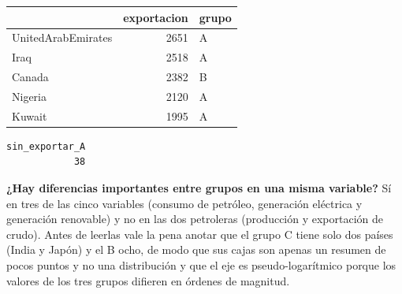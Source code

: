 \documentclass[oneside, openany, fontset=libertinus]{mitthesis}
\newenvironment{Shaded}{\begin{snugshade}}{\end{snugshade}}
\newcommand{\AttributeTok}[1]{\textcolor[rgb]{0.40,0.45,0.13}{#1}}
\newcommand{\DecValTok}[1]{\textcolor[rgb]{0.68,0.00,0.00}{#1}}
\newcommand{\FunctionTok}[1]{\textcolor[rgb]{0.28,0.35,0.67}{#1}}
\newcommand{\NormalTok}[1]{\textcolor[rgb]{0.00,0.23,0.31}{#1}}
\newcommand{\OtherTok}[1]{\textcolor[rgb]{0.00,0.23,0.31}{#1}}
\newcommand{\SpecialCharTok}[1]{\textcolor[rgb]{0.37,0.37,0.37}{#1}}
\newcommand{\StringTok}[1]{\textcolor[rgb]{0.13,0.47,0.30}{#1}}
\begin{document}
\Needspace{2.66in}

\begin{Shaded}
\end{Shaded}

\Needspace{1.93in}

{\def\LTcaptype{none} %
\begin{longtable}[]{@{}lrl@{}}
\toprule\noalign{}
& exportacion & grupo \\
\midrule\noalign{}
\endhead
\bottomrule\noalign{}
\endlastfoot
UnitedArabEmirates & 2651 & A \\
Iraq & 2518 & A \\
Canada & 2382 & B \\
Nigeria & 2120 & A \\
Kuwait & 1995 & A \\
\end{longtable}
}

\Needspace{0.57in}

\begin{Shaded}
\end{Shaded}

\begin{verbatim}
sin_exportar_A 
            38 
\end{verbatim}

\textbf{¿Hay diferencias importantes entre grupos en una misma
variable?} Sí en tres de las cinco variables (consumo de petróleo,
generación eléctrica y generación renovable) y no en las dos petroleras
(producción y exportación de crudo). Antes de leerlas vale la pena
anotar que el grupo C tiene solo dos países (India y Japón) y el B ocho,
de modo que sus cajas son apenas un resumen de pocos puntos y no una
distribución y que el eje es pseudo-logarítmico porque los valores de
los tres grupos difieren en órdenes de magnitud.
\end{document}
